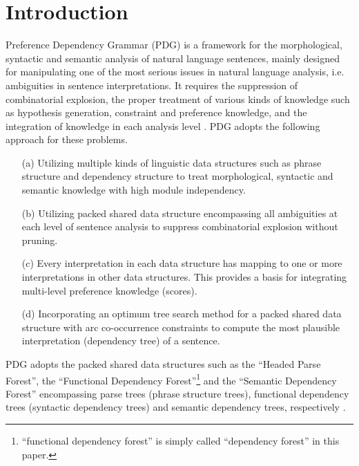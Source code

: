 \maketitle
\thispagestyle{empty}


\section{Introduction}
Preference Dependency Grammar (PDG) is a framework for the
morphological, syntactic and semantic analysis of natural language
sentences, mainly designed for manipulating one of the most serious
issues in natural language analysis, i.e. ambiguities in sentence
interpretations. It requires the suppression of combinatorial
explosion, the proper treatment of various kinds of knowledge such as
hypothesis generation, constraint and preference knowledge, and the
integration of knowledge in each analysis
level \cite{Hirakawa01,Hirakawa05a}. PDG adopts the following approach
for these problems.

\begin{itemize}
\item [(a)] Utilizing multiple kinds of linguistic data structures such
as phrase structure and dependency structure to treat morphological,
syntactic and semantic knowledge with high module independency.
\item [(b)] Utilizing packed shared data structure encompassing all
ambiguities at each level of sentence analysis to suppress
combinatorial explosion without pruning.
\item [(c)] Every interpretation in each data structure has
mapping to one or more interpretations in other data structures. This
provides a basis for integrating multi-level preference knowledge
(scores).
\item [(d)] Incorporating an optimum tree search method for a packed
shared data structure with arc co-occurrence constraints to
compute the most plausible interpretation (dependency tree) of a sentence.
\end{itemize}

PDG adopts the packed shared data structures such as the ``Headed Parse
Forest'', the ``Functional Dependency Forest''\footnote{``functional
dependency forest'' is simply called ``dependency forest'' in this
paper.} and the ``Semantic Dependency Forest'' encompassing parse trees
(phrase structure trees), functional dependency trees (syntactic
dependency trees) and semantic dependency trees, respectively
\cite{Hirakawa05a}.

